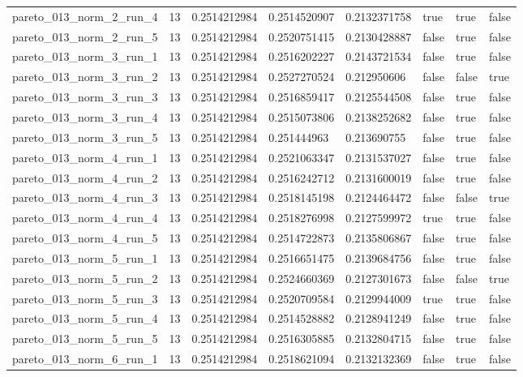 \begin{tabular}{@{}llllllll@{}}
pareto\_013\_norm\_2\_run\_4 & 13 & 0.2514212984 & 0.2514520907 & 0.2132371758 & true & true & false \\
pareto\_013\_norm\_2\_run\_5 & 13 & 0.2514212984 & 0.2520751415 & 0.2130428887 & false & true & false \\
pareto\_013\_norm\_3\_run\_1 & 13 & 0.2514212984 & 0.2516202227 & 0.2143721534 & false & true & false \\
pareto\_013\_norm\_3\_run\_2 & 13 & 0.2514212984 & 0.2527270524 & 0.212950606 & false & false & true \\
pareto\_013\_norm\_3\_run\_3 & 13 & 0.2514212984 & 0.2516859417 & 0.2125544508 & false & true & false \\
pareto\_013\_norm\_3\_run\_4 & 13 & 0.2514212984 & 0.2515073806 & 0.2138252682 & false & true & false \\
pareto\_013\_norm\_3\_run\_5 & 13 & 0.2514212984 & 0.251444963 & 0.213690755 & false & true & false \\
pareto\_013\_norm\_4\_run\_1 & 13 & 0.2514212984 & 0.2521063347 & 0.2131537027 & false & true & false \\
pareto\_013\_norm\_4\_run\_2 & 13 & 0.2514212984 & 0.2516242712 & 0.2131600019 & false & true & false \\
pareto\_013\_norm\_4\_run\_3 & 13 & 0.2514212984 & 0.2518145198 & 0.2124464472 & false & false & true \\
pareto\_013\_norm\_4\_run\_4 & 13 & 0.2514212984 & 0.2518276998 & 0.2127599972 & true & true & false \\
pareto\_013\_norm\_4\_run\_5 & 13 & 0.2514212984 & 0.2514722873 & 0.2135806867 & false & true & false \\
pareto\_013\_norm\_5\_run\_1 & 13 & 0.2514212984 & 0.2516651475 & 0.2139684756 & false & true & false \\
pareto\_013\_norm\_5\_run\_2 & 13 & 0.2514212984 & 0.2524660369 & 0.2127301673 & false & false & true \\
pareto\_013\_norm\_5\_run\_3 & 13 & 0.2514212984 & 0.2520709584 & 0.2129944009 & true & true & false \\
pareto\_013\_norm\_5\_run\_4 & 13 & 0.2514212984 & 0.2514528882 & 0.2128941249 & false & true & false \\
pareto\_013\_norm\_5\_run\_5 & 13 & 0.2514212984 & 0.2516305885 & 0.2132804715 & false & true & false \\
pareto\_013\_norm\_6\_run\_1 & 13 & 0.2514212984 & 0.2518621094 & 0.2132132369 & false & true & false \\

\end{tabular}
